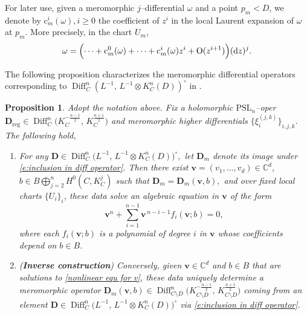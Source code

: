 \documentclass[twoside, 11pt]{article}
\numberwithin{equation}{section}
\theoremstyle{theorem}
\numberwithin{theorem}{section}
\newtheorem{proposition}[proposition]{Proposition}
\theoremstyle{definition}
\begin{document}
For later use, given a meromorphic $j$--differential $\omega$ and a point $p_m < D$, we denote by
\(
\mathrm{c}^i_{m}(\omega), i \geq 0
\)
the coefficient of $z^{i}$ in the local Laurent expansion of $\omega$ at $p_m$. More precisely, in the chart $U_m$,
\[
\omega=\Bigl(\cdots+\mathrm{c}^0_{m}(\omega)+\cdots+\mathrm{c}^i_{m}(\omega)z^i+ \mathrm O(z^{i+1})\Bigr)(\mathrm d z)^j.
\]

\medskip
The following proposition characterizes the meromorphic differential operators
corresponding to $\operatorname{Diff}_C^{n} (L^{-1},\,L^{-1}\otimes K_C^{n}(D))^\circ$ in .

\begin{proposition}\label{p:AP-to-algebraic-v}
Adopt the notation above. Fix a holomorphic $\mathrm{PSL}_n$--oper
\(
\mathbf D_{\mathrm{reg}} \in \operatorname{Diff}_C^{n}\bigl(K_C^{-\frac{n-1}{2}},\,K_C^{\frac{n+1}{2}}\bigr)
\)
and meromorphic higher differentials $\{ \xi_i^{(j,k)} \}_{i,j,k}$.
The following hold,
\begin{enumerate}
\item For any
\(
\mathbf D\in \operatorname{Diff}_C^{n}\!\bigl(L^{-1},\,L^{-1}\otimes K_C^{n}(D)\bigr)^{\circ},
\)
let $\mathbf D_m$ denote its image under \eqref{e:inclusion in diff operator}.
Then there exist $\boldsymbol v =(v_1,\dots,v_d)\in \mathbb C^d$, $b\in B\bigoplus_{j=2}^n H^0(C,K_C^j)$ such that
\(
\mathbf D_m=\mathbf D_m(\boldsymbol v, b),
\)
and over fixed local charts $\{U_i\}_i$, these data solve an algebraic equation in $\boldsymbol v$ of the form 
\begin{equation}\label{nonlinear equ for v}
\boldsymbol v^n+\sum_{i=1}^{n-1}\boldsymbol v^{\,n-i-1} f_i(\boldsymbol v;b)=0,
\end{equation}
where each $f_i(\boldsymbol v;b)$ is a polynomial of degree $i$ in $\boldsymbol v$ whose coefficients depend on $b\in B$.

\item
(\textbf{Inverse construction})
Conversely, given $\boldsymbol v\in \mathbb C^d$ and $b\in B$ that are solutions to \eqref{nonlinear equ for v}, these data uniquely determine a meromorphic operator
\(
\mathbf D_m(\boldsymbol v,b) \in \operatorname{Diff}_{C\setminus D}^n \bigl(K_{C\setminus D}^{-\frac{n-1}{2}},\,K_{C\setminus D}^{\frac{n+1}{2}}\bigr)
\)
coming from an element 
\(
\mathbf D \in \operatorname{Diff}_C^{n} \bigl(L^{-1},\,L^{-1}\otimes K_C^{n}(D)\bigr)^{\circ} 
\)
via \eqref{e:inclusion in diff operator}.
\end{enumerate}
\end{proposition}
\end{document}
